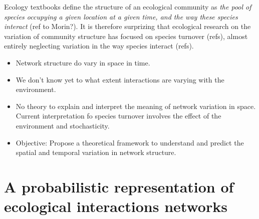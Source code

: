 \documentclass[12pt]{article}
\begin{document}
Ecology textbooks define the structure of an ecological community as
\emph{the pool of species occupying a given location at a given time, and
the way these species interact} (ref to Morin?). It is therefore surprizing
that ecological research on the variation of community structure has focused
on species turnover (refs), almost entirely neglecting variation in the way
species interact (refs).

\begin{itemize}
\item Network structure do vary in space in time. \\ 

\item We don't know yet to what extent interactions are varying with the
environment. \\

\item No theory to explain and interpret the meaning of network variation in space.
Current interpretation fo species turnover involves the effect of the
environment and stochasticity. \\

\item Objective: Propose a theoretical framework to understand and predict the
spatial and temporal variation in network structure.\\

\end{itemize}

\newpage
\section*{A probabilistic representation of ecological interactions networks}

\end{document}
